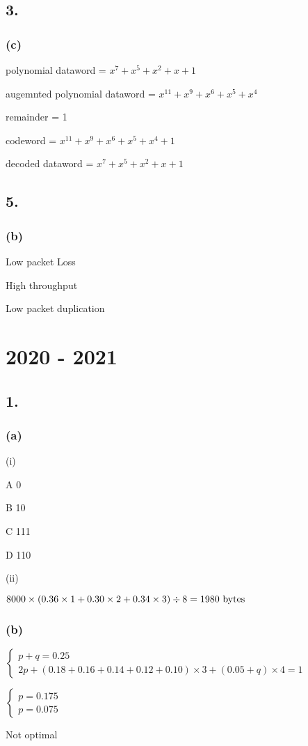 \documentclass{article}
\begin{document}
\subsection*{3.}
\subsubsection*{(c)}
polynomial dataword = $x^{7}+x^{5}+x^{2}+x+1$\par
augemnted polynomial dataword = $x^{11}+x^{9}+x^{6}+x^{5}+x^{4}$\par
remainder = 1\par
codeword = $x^{11}+x^{9}+x^{6}+x^{5}+x^{4}+1$\par
decoded dataword = $x^{7}+x^{5}+x^{2}+x+1$\par


\subsection*{5.}
\subsubsection*{(b)}
Low packet Loss\par
High throughput\par
Low packet duplication

\clearpage


\section*{2020 - 2021}
\subsection*{1.}
\subsubsection*{(a)}
(i)\par
A 0\par
B 10\par
C 111\par
D 110\par\indent
\par

(ii)\par
$8000 \times (0.36 \times 1 + 0.30 \times 2 + 0.34 \times 3) \div 8 = 1980 \ {\rm bytes}$
\subsubsection*{(b)}
$\begin{cases}
p+q=0.25 \\
2p+(0.18+0.16+0.14+0.12+0.10)\times 3+(0.05+q)\times 4=1
\end{cases}$\par\indent
\par
$\begin{cases}
p=0.175 \\
p=0.075
\end{cases}$\par\indent
\par
Not optimal
\end{document}
